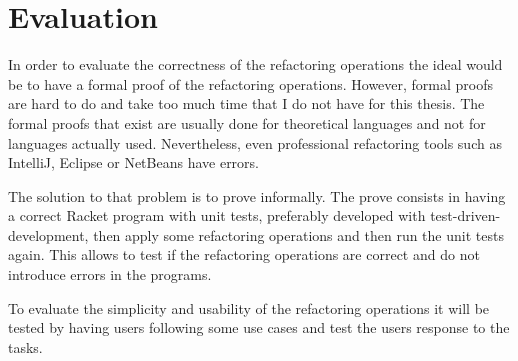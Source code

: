 
% 
% 

\section{Evaluation}


In order to evaluate the correctness of the refactoring operations the ideal would be to have a formal proof of the refactoring operations.
However, formal proofs are hard to do and take too much time that I do not have for this thesis.
The formal proofs that exist are usually done for theoretical languages and not for languages actually used.
Nevertheless, even professional refactoring tools such as IntelliJ, Eclipse or NetBeans have errors. \cite{verbaere2006jungl} 

The solution to that problem is to prove informally. 
The prove consists in having a correct Racket program with unit tests, preferably developed with test-driven-development, then apply some refactoring operations and then run the unit tests again. 
This allows to test if the refactoring operations are correct and do not introduce errors in the programs.

To evaluate the simplicity and usability of the refactoring operations it will be tested by having users following some use cases and test the users response to the tasks.